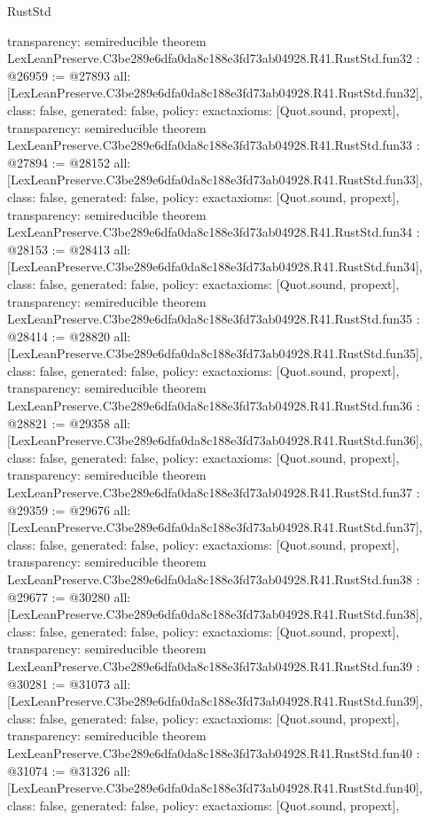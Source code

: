 \begin{lexlean}{RustStd}
\begin{coremodule}
{  transparency: semireducible
}
theorem LexLeanPreserve.C3be289e6dfa0da8c188e3fd73ab04928.R41.RustStd.fun32 : @26959 := @27893 {
  all: [LexLeanPreserve.C3be289e6dfa0da8c188e3fd73ab04928.R41.RustStd.fun32],
  class: false,
  generated: false,
  policy: exact{axioms: [Quot.sound, propext]},
  transparency: semireducible
}
theorem LexLeanPreserve.C3be289e6dfa0da8c188e3fd73ab04928.R41.RustStd.fun33 : @27894 := @28152 {
  all: [LexLeanPreserve.C3be289e6dfa0da8c188e3fd73ab04928.R41.RustStd.fun33],
  class: false,
  generated: false,
  policy: exact{axioms: [Quot.sound, propext]},
  transparency: semireducible
}
theorem LexLeanPreserve.C3be289e6dfa0da8c188e3fd73ab04928.R41.RustStd.fun34 : @28153 := @28413 {
  all: [LexLeanPreserve.C3be289e6dfa0da8c188e3fd73ab04928.R41.RustStd.fun34],
  class: false,
  generated: false,
  policy: exact{axioms: [Quot.sound, propext]},
  transparency: semireducible
}
theorem LexLeanPreserve.C3be289e6dfa0da8c188e3fd73ab04928.R41.RustStd.fun35 : @28414 := @28820 {
  all: [LexLeanPreserve.C3be289e6dfa0da8c188e3fd73ab04928.R41.RustStd.fun35],
  class: false,
  generated: false,
  policy: exact{axioms: [Quot.sound, propext]},
  transparency: semireducible
}
theorem LexLeanPreserve.C3be289e6dfa0da8c188e3fd73ab04928.R41.RustStd.fun36 : @28821 := @29358 {
  all: [LexLeanPreserve.C3be289e6dfa0da8c188e3fd73ab04928.R41.RustStd.fun36],
  class: false,
  generated: false,
  policy: exact{axioms: [Quot.sound, propext]},
  transparency: semireducible
}
theorem LexLeanPreserve.C3be289e6dfa0da8c188e3fd73ab04928.R41.RustStd.fun37 : @29359 := @29676 {
  all: [LexLeanPreserve.C3be289e6dfa0da8c188e3fd73ab04928.R41.RustStd.fun37],
  class: false,
  generated: false,
  policy: exact{axioms: [Quot.sound, propext]},
  transparency: semireducible
}
theorem LexLeanPreserve.C3be289e6dfa0da8c188e3fd73ab04928.R41.RustStd.fun38 : @29677 := @30280 {
  all: [LexLeanPreserve.C3be289e6dfa0da8c188e3fd73ab04928.R41.RustStd.fun38],
  class: false,
  generated: false,
  policy: exact{axioms: [Quot.sound, propext]},
  transparency: semireducible
}
theorem LexLeanPreserve.C3be289e6dfa0da8c188e3fd73ab04928.R41.RustStd.fun39 : @30281 := @31073 {
  all: [LexLeanPreserve.C3be289e6dfa0da8c188e3fd73ab04928.R41.RustStd.fun39],
  class: false,
  generated: false,
  policy: exact{axioms: [Quot.sound, propext]},
  transparency: semireducible
}
theorem LexLeanPreserve.C3be289e6dfa0da8c188e3fd73ab04928.R41.RustStd.fun40 : @31074 := @31326 {
  all: [LexLeanPreserve.C3be289e6dfa0da8c188e3fd73ab04928.R41.RustStd.fun40],
  class: false,
  generated: false,
  policy: exact{axioms: [Quot.sound, propext]},
}
\end{coremodule}
\end{lexlean}
